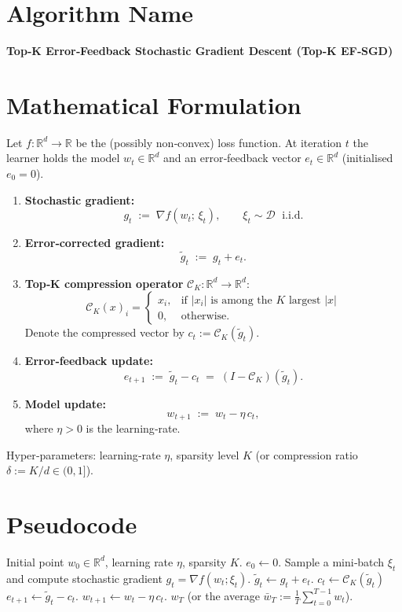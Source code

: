 \documentclass{article}
\newcommand{\R}{\mathbb{R}}
\newcommand{\topk}{\mathcal{C}_K}
\begin{document}
\section*{Algorithm Name}
\textbf{Top‑K Error‑Feedback Stochastic Gradient Descent (Top‑K EF‑SGD)}

\section*{Mathematical Formulation}
Let $f:\R^{d}\rightarrow\R$ be the (possibly non‑convex) loss function.  
At iteration $t$ the learner holds the model $w_t\in\R^{d}$ and an
error‑feedback vector $e_t\in\R^{d}$ (initialised $e_0=0$).  

\begin{enumerate}
\item \textbf{Stochastic gradient:}
\[
g_t \;:=\; \nabla f(w_t;\,\xi_t),\qquad 
\xi_t\sim\mathcal{D}\;\text{ i.i.d.}
\]
\item \textbf{Error‑corrected gradient:}
\[
\tilde g_t \;:=\; g_t+e_t .
\]
\item \textbf{Top‑K compression operator} $\topk:\R^{d}\to\R^{d}$:
\[
\topk(x)_i=
\begin{cases}
x_i, & \text{if } |x_i| \text{ is among the $K$ largest }|x|\\[2mm]
0,   & \text{otherwise.}
\end{cases}
\]
Denote the compressed vector by $c_t:=\topk(\tilde g_t)$.
\item \textbf{Error‑feedback update:}
\[
e_{t+1}\;:=\;\tilde g_t-c_t
      \;=\;(I-\topk)(\tilde g_t).
\]
\item \textbf{Model update:}
\[
w_{t+1}\;:=\;w_t-\eta\,c_t,
\]
where $\eta>0$ is the learning‑rate.
\end{enumerate}

Hyper‑parameters: learning‑rate $\eta$, sparsity level $K$ (or compression ratio
$\delta:=K/d\in(0,1]$).

\section*{Pseudocode}
\begin{algorithm}[H]
\caption{Top‑K EF‑SGD}
\begin{algorithmic}[1]
\REQUIRE Initial point $w_0\in\R^{d}$, learning rate $\eta$, sparsity $K$.
\STATE $e_0\gets 0$.
    \STATE Sample a mini‑batch $\xi_t$ and compute stochastic gradient $g_t=\nabla f(w_t;\xi_t)$.
    \STATE $\tilde g_t\gets g_t+e_t$.
    \STATE $c_t\gets \topk(\tilde g_t)$ 
    \STATE $e_{t+1}\gets \tilde g_t-c_t$.
    \STATE $w_{t+1}\gets w_t-\eta\,c_t$.
\ENDFOR
\RETURN $w_T$ (or the average $\bar w_T:=\frac1T\sum_{t=0}^{T-1}w_t$).
\end{algorithmic}
\end{algorithm}
\end{document}
